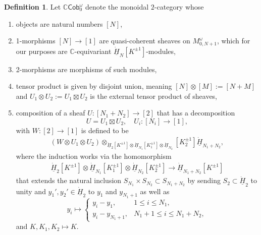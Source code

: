 \documentclass[11pt]{report}
\theoremstyle{definition}
\newtheorem{definition}[theorem]{Definition}
\theoremstyle{remark}
\theoremstyle{remark}
\newcommand{\C}{\mathbb{C}}
\begin{document}
\begin{definition}
Let $\C\mathsf{Cob}_0^\omega$ denote the monoidal $2$-category whose
\begin{enumerate}[label=(\roman*)]
\item objects are natural numbers $[N]$,
\item 1-morphisms $[N] \to [1]$ are quasi-coherent sheaves on $M_{0,N+1}^\omega$, %
which for our purposes are $\C$-equivariant $\underline{\dot H}_N[K^{\pm 1}]$-modules,
\item 2-morphisms are morphisms of such modules,
\item tensor product is given by disjoint union, meaning $[N] \otimes [M] := [N+M]$ and $U_1 \otimes U_2 := U_1 \boxtimes U_2$ is the external tensor product of sheaves,
\item composition of a sheaf $U: [N_1+N_2] \to [2]$ that has a decomposition
\begin{equation*}
U = U_1 \boxtimes U_2, \quad U_i: [N_i] \to [1],
\end{equation*}
with $W: [2] \to [1]$ is defined to be
\begin{align*}
(W \otimes U_1 \otimes U_2) \otimes_{\underline{\dot H}_2[K^{\pm 1}] \otimes \underline{\dot H}_{N_1}[K_1^{\pm 1}] \otimes \underline{\dot H}_{N_2}}[K_2^{\pm 1}] \underline{\dot H}_{N_1+N_2},
\end{align*}
where the induction works via the homomorphism
\begin{align*}
\underline{\dot H}_2[K^{\pm 1}] \otimes \underline{\dot H}_{N_1}[K_1^{\pm 1}] \otimes \underline{\dot H}_{N_2}[K_2^{\pm 1}] \to \underline{\dot H}_{N_1+N_2}[K^{\pm 1}]
\end{align*}
that extends the natural inclusion $S_{N_1} \times S_{N_2} \subset S_{N_1+N_2}$ by sending $S_2 \subset \underline{\dot H}_2$ to unity and $y_1',y_2' \in \underline{\dot H}_2$ to $y_1$ and $y_{N_1+1}$ as well as
\begin{equation*}
y_i \mapsto
\begin{cases}
y_i-y_1, & 1 \leq i \leq N_1, \\
y_i-y_{N_1+1}, & N_1+1 \leq i \leq N_1+N_2,
\end{cases}
\end{equation*}
and $K,K_1,K_2 \mapsto K$.
\end{enumerate}
\end{definition}
\end{document}
